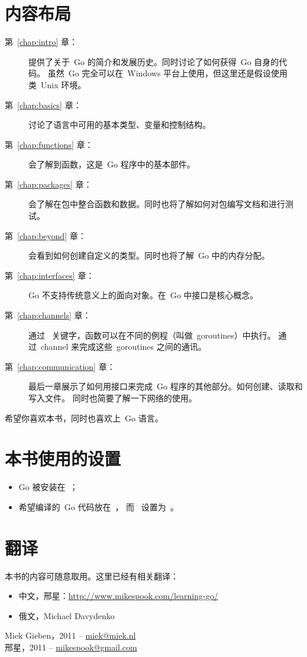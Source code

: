 \section*{内容布局}
\begin{description}
\item[第~\ref{chap:intro} 章：]
提供了关于~Go 的简介和发展历史。同时讨论了如何获得~Go 自身的代码。
虽然~Go 完全可以在~Windows 平台上使用，但这里还是假设使用类~Unix 环境。

\item[第~\ref{chap:basics} 章：]
讨论了语言中可用的基本类型、变量和控制结构。

\item[第~\ref{chap:functions} 章：]
会了解到函数，这是~Go 程序中的基本部件。

\item[第~\ref{chap:packages} 章：]
会了解在包中整合函数和数据。同时也将了解如何对包编写文档和进行测试。

\item[第~\ref{chap:beyond} 章：]
会看到如何创建自定义的类型。同时也将了解~Go 中的内存分配。

\item[第~\ref{chap:interfaces} 章：]
Go 不支持传统意义上的面向对象。在~Go 中接口是核心概念。

\item[第~\ref{chap:channels} 章：]
通过~ 关键字，函数可以在不同的例程（叫做~goroutines）中执行。
通过~channel 来完成这些~goroutines 之间的通讯。

\item[第~\ref{chap:communication} 章：]
最后一章展示了如何用接口来完成~Go 程序的其他部分。如何创建、读取和写入文件。
同时也简要了解一下网络的使用。
\end{description}

希望你喜欢本书，同时也喜欢上~Go 语言。

\section{本书使用的设置}
\label{sec:settings used}
\begin{itemize}                            
\item Go 被安装在~；
\item 希望编译的~Go 代码放在~， 
而~ 设置为~。
\end{itemize}

\section*{翻译}
本书的内容可随意取用。这里已经有相关翻译：
\begin{itemize}
\item 中文，邢星：\url{http://www.mikespook.com/learning-go/}
\item 俄文，Michael Davydenko
\end{itemize}

\begin{raggedright}
Miek Gieben，2011 -- \url{miek@miek.nl}\\
邢星，2011 -- \url{mikespook@gmail.com}
\end{raggedright}
